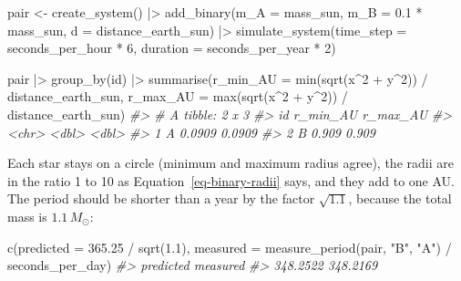 \documentclass[
  10.5pt,
  letterpaper,
]{scrbook}
\newenvironment{Shaded}{\begin{snugshade}}{\end{snugshade}}
\newcommand{\AttributeTok}[1]{\textcolor[rgb]{0.00,0.00,0.00}{#1}}
\newcommand{\CommentTok}[1]{\textcolor[rgb]{0.00,0.00,0.00}{\textit{#1}}}
\newcommand{\DecValTok}[1]{\textcolor[rgb]{0.00,0.00,0.00}{#1}}
\newcommand{\FloatTok}[1]{\textcolor[rgb]{0.00,0.00,0.00}{#1}}
\newcommand{\FunctionTok}[1]{\textcolor[rgb]{0.00,0.00,0.00}{#1}}
\newcommand{\NormalTok}[1]{\textcolor[rgb]{0.00,0.00,0.00}{#1}}
\newcommand{\OtherTok}[1]{\textcolor[rgb]{0.00,0.00,0.00}{#1}}
\newcommand{\SpecialCharTok}[1]{\textcolor[rgb]{0.00,0.00,0.00}{#1}}
\newcommand{\StringTok}[1]{\textcolor[rgb]{0.00,0.00,0.00}{#1}}
\theoremstyle{plain}
\theoremstyle{remark}
\begin{document}
\begin{Shaded}
\begin{Highlighting}[]
\NormalTok{pair }\OtherTok{\textless{}{-}} \FunctionTok{create\_system}\NormalTok{() }\SpecialCharTok{|\textgreater{}}
  \FunctionTok{add\_binary}\NormalTok{(}\AttributeTok{m\_A =}\NormalTok{ mass\_sun, }\AttributeTok{m\_B =} \FloatTok{0.1} \SpecialCharTok{*}\NormalTok{ mass\_sun, }\AttributeTok{d =}\NormalTok{ distance\_earth\_sun) }\SpecialCharTok{|\textgreater{}}
  \FunctionTok{simulate\_system}\NormalTok{(}\AttributeTok{time\_step =}\NormalTok{ seconds\_per\_hour }\SpecialCharTok{*} \DecValTok{6}\NormalTok{, }\AttributeTok{duration =}\NormalTok{ seconds\_per\_year }\SpecialCharTok{*} \DecValTok{2}\NormalTok{)}

\NormalTok{pair }\SpecialCharTok{|\textgreater{}}
  \FunctionTok{group\_by}\NormalTok{(id) }\SpecialCharTok{|\textgreater{}}
  \FunctionTok{summarise}\NormalTok{(}\AttributeTok{r\_min\_AU =} \FunctionTok{min}\NormalTok{(}\FunctionTok{sqrt}\NormalTok{(x}\SpecialCharTok{\^{}}\DecValTok{2} \SpecialCharTok{+}\NormalTok{ y}\SpecialCharTok{\^{}}\DecValTok{2}\NormalTok{)) }\SpecialCharTok{/}\NormalTok{ distance\_earth\_sun,}
            \AttributeTok{r\_max\_AU =} \FunctionTok{max}\NormalTok{(}\FunctionTok{sqrt}\NormalTok{(x}\SpecialCharTok{\^{}}\DecValTok{2} \SpecialCharTok{+}\NormalTok{ y}\SpecialCharTok{\^{}}\DecValTok{2}\NormalTok{)) }\SpecialCharTok{/}\NormalTok{ distance\_earth\_sun)}
\CommentTok{\#\textgreater{} \# A tibble: 2 x 3}
\CommentTok{\#\textgreater{}   id    r\_min\_AU r\_max\_AU}
\CommentTok{\#\textgreater{}   \textless{}chr\textgreater{}    \textless{}dbl\textgreater{}    \textless{}dbl\textgreater{}}
\CommentTok{\#\textgreater{} 1 A       0.0909   0.0909}
\CommentTok{\#\textgreater{} 2 B       0.909    0.909}
\end{Highlighting}
\end{Shaded}

Each star stays on a circle (minimum and maximum radius agree), the
radii are in the ratio 1 to 10 as Equation~\ref{eq-binary-radii} says,
and they add to one AU. The period should be shorter than a year by the
factor \(\sqrt{1.1}\), because the total mass is \(1.1\,M_\odot\):

\begin{Shaded}
\begin{Highlighting}[]
\FunctionTok{c}\NormalTok{(}\AttributeTok{predicted =} \FloatTok{365.25} \SpecialCharTok{/} \FunctionTok{sqrt}\NormalTok{(}\FloatTok{1.1}\NormalTok{),}
  \AttributeTok{measured  =} \FunctionTok{measure\_period}\NormalTok{(pair, }\StringTok{"B"}\NormalTok{, }\StringTok{"A"}\NormalTok{) }\SpecialCharTok{/}\NormalTok{ seconds\_per\_day)}
\CommentTok{\#\textgreater{} predicted  measured }
\CommentTok{\#\textgreater{}  348.2522  348.2169}
\end{Highlighting}
\end{Shaded}
\end{document}
